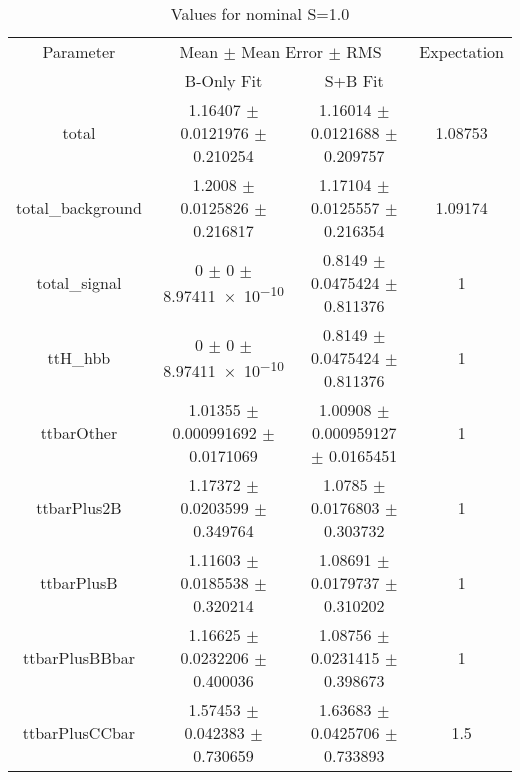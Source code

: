 \begin{table}
\centering
\caption{Values for nominal S=1.0}
\begin{tabular}{cccc}
\toprule
Parameter & \multicolumn{2}{c}{Mean $\pm$ Mean Error $\pm$ RMS} & Expectation\\
 & B-Only Fit & S+B Fit & \\
\midrule
total & \num{1.16407} $\pm$ \num{0.0121976} $\pm$ \num{0.210254} & \num{1.16014} $\pm$ \num{0.0121688} $\pm$ \num{0.209757} & \num{1.08753}\\
total\_background & \num{1.2008} $\pm$ \num{0.0125826} $\pm$ \num{0.216817} & \num{1.17104} $\pm$ \num{0.0125557} $\pm$ \num{0.216354} & \num{1.09174}\\
total\_signal & \num{0} $\pm$ \num{0} $\pm$ \num{8.97411e-10} & \num{0.8149} $\pm$ \num{0.0475424} $\pm$ \num{0.811376} & \num{1}\\
ttH\_hbb & \num{0} $\pm$ \num{0} $\pm$ \num{8.97411e-10} & \num{0.8149} $\pm$ \num{0.0475424} $\pm$ \num{0.811376} & \num{1}\\
ttbarOther & \num{1.01355} $\pm$ \num{0.000991692} $\pm$ \num{0.0171069} & \num{1.00908} $\pm$ \num{0.000959127} $\pm$ \num{0.0165451} & \num{1}\\
ttbarPlus2B & \num{1.17372} $\pm$ \num{0.0203599} $\pm$ \num{0.349764} & \num{1.0785} $\pm$ \num{0.0176803} $\pm$ \num{0.303732} & \num{1}\\
ttbarPlusB & \num{1.11603} $\pm$ \num{0.0185538} $\pm$ \num{0.320214} & \num{1.08691} $\pm$ \num{0.0179737} $\pm$ \num{0.310202} & \num{1}\\
ttbarPlusBBbar & \num{1.16625} $\pm$ \num{0.0232206} $\pm$ \num{0.400036} & \num{1.08756} $\pm$ \num{0.0231415} $\pm$ \num{0.398673} & \num{1}\\
ttbarPlusCCbar & \num{1.57453} $\pm$ \num{0.042383} $\pm$ \num{0.730659} & \num{1.63683} $\pm$ \num{0.0425706} $\pm$ \num{0.733893} & \num{1.5}\\
\bottomrule
\end{tabular}
\end{table}